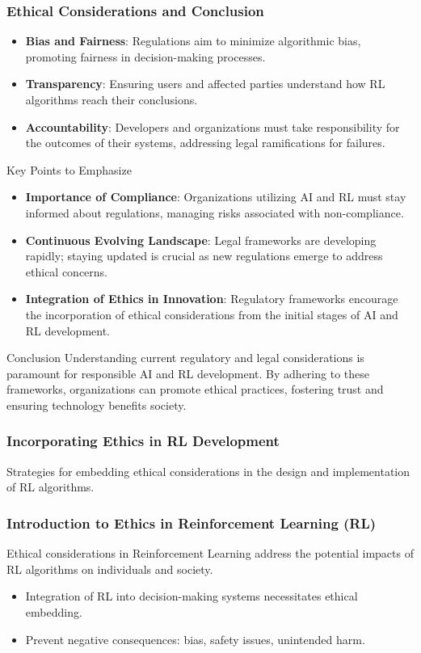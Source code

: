 \documentclass{beamer}
\begin{document}
\begin{frame}[fragile]
    \frametitle{Ethical Considerations and Conclusion}
    \begin{itemize}
        \item \textbf{Bias and Fairness}: Regulations aim to minimize algorithmic bias, promoting fairness in decision-making processes.
        \item \textbf{Transparency}: Ensuring users and affected parties understand how RL algorithms reach their conclusions.
        \item \textbf{Accountability}: Developers and organizations must take responsibility for the outcomes of their systems, addressing legal ramifications for failures.
    \end{itemize}

    \begin{block}{Key Points to Emphasize}
        \begin{itemize}
            \item \textbf{Importance of Compliance}: Organizations utilizing AI and RL must stay informed about regulations, managing risks associated with non-compliance.
            \item \textbf{Continuous Evolving Landscape}: Legal frameworks are developing rapidly; staying updated is crucial as new regulations emerge to address ethical concerns.
            \item \textbf{Integration of Ethics in Innovation}: Regulatory frameworks encourage the incorporation of ethical considerations from the initial stages of AI and RL development.
        \end{itemize}
    \end{block}

    \begin{block}{Conclusion}
        Understanding current regulatory and legal considerations is paramount for responsible AI and RL development. By adhering to these frameworks, organizations can promote ethical practices, fostering trust and ensuring technology benefits society.
    \end{block}
\end{frame}

\begin{frame}[fragile]
    \frametitle{Incorporating Ethics in RL Development}
    Strategies for embedding ethical considerations in the design and implementation of RL algorithms.
\end{frame}

\begin{frame}[fragile]
    \frametitle{Introduction to Ethics in Reinforcement Learning (RL)}
    Ethical considerations in Reinforcement Learning address the potential impacts of RL algorithms on individuals and society.
    
    \begin{itemize}
        \item Integration of RL into decision-making systems necessitates ethical embedding.
        \item Prevent negative consequences: bias, safety issues, unintended harm.
    \end{itemize}
\end{frame}
\end{document}
